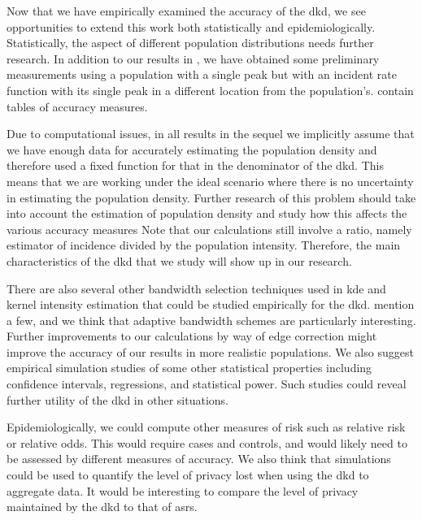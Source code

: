 

Now that we have empirically examined the accuracy of the \gls{dkd},
we see opportunities to extend this work both statistically and epidemiologically.
Statistically,
the aspect of different population distributions needs further research.
In addition to our results in ,
we have obtained some preliminary measurements using a population with a single peak
but with an incident rate function with its single peak in a different location from the population's.
 contain tables of accuracy measures.

Due to computational issues,
in all results in the sequel we implicitly assume that we have enough data for accurately estimating the population density and therefore used a fixed function for that in the denominator of the \gls{dkd}.
This means that we are working under the ideal scenario where there is no uncertainty in estimating the population density.
Further research of this problem should take into account the estimation of population density and study how this affects the various accuracy measures
Note that our calculations still involve a ratio, namely estimator of incidence divided by the population intensity.
Therefore, the main characteristics of the \gls{dkd} that we study will show up in our research.

There are also several other bandwidth selection techniques used in \gls{kde}
and \gls{kernel intensity estimation} that could be studied empirically for the \gls{dkd}.
\citet{silverman1986density,wand1994kernel} mention a few,
and we think that adaptive bandwidth schemes are particularly interesting.
Further improvements to our calculations by way of edge correction might improve the accuracy of our results in more realistic populations.
We also suggest empirical simulation studies of some other statistical properties  
including confidence intervals, regressions, and statistical power.
Such studies could reveal further utility of the \gls{dkd} in other situations.

Epidemiologically,
we could compute other measures of risk such as relative risk or relative odds.
This would require cases and controls,
and would likely need to be assessed by different measures of accuracy.
We also think that simulations could be used to quantify the level of privacy lost when using the \gls{dkd} to aggregate data.
It would be interesting to compare the level of privacy maintained by the \gls{dkd} to that of \glspl{asr}.
